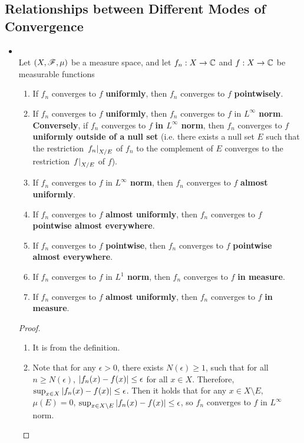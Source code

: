\documentclass[11pt]{article}
\begin{document}
\subsection{Relationships between Different Modes of Convergence}
\begin{itemize}
\item \begin{proposition} \citep{tao2011introduction}\\
 Let $(X, {\mathscr F}, \mu)$ be a measure space, and let $f_n : X \rightarrow {\mathbb C}$ and $f : X \rightarrow {\mathbb C}$ be measurable functions
\begin{enumerate}
\item If $f_n$ converges to $f$ \textbf{uniformly}, then $f_n$ converges to $f$ \textbf{pointwisely}.
\item If $f_n$ converges to $f$ \textbf{uniformly}, then $f_n$ converges to $f$ in \textbf{$L^\infty$ norm}. \textbf{Conversely}, if $f_n$ converges to $f$ \textbf{in $L^\infty$ norm}, then $f_n$ converges to $f$ \textbf{uniformly outside of a null set} (i.e. there exists a null set $E$ such that the restriction $\left.{f_n}\right\vert_{X/E}$ of $f_n$ to the complement of $E$ converges to the restriction $\left.{f}\right\vert_{X/E}$ of $f$).
\item If $f_n$ converges to $f$ in \textbf{$L^\infty$ norm}, then $f_n$ converges to $f$ \textbf{almost uniformly}.
\item If $f_n$ converges to $f$ \textbf{almost uniformly}, then $f_n$ converges to $f$ \textbf{pointwise almost everywhere}.
\item If $f_n$ converges to $f$ \textbf{pointwise}, then $f_n$ converges to $f$ \textbf{pointwise almost everywhere}.
\item If $f_n$ converges to $f$ in \textbf{$L^1$ norm}, then $f_n$ converges to $f$ \textbf{in measure}.
\item If $f_n$ converges to $f$ \textbf{almost uniformly}, then $f_n$ converges to $f$ \textbf{in measure}.
\end{enumerate}
\end{proposition}
\begin{proof}
\begin{enumerate}
\item It is from the definition.
\item Note that for any $\epsilon>0$, there exists $N(\epsilon)\ge 1$, such that for all $n\ge N(\epsilon)$, $\left\lvert f_{n}(x)- f(x) \right\rvert\le \epsilon$ for all $x\in X$. Therefore, $\sup_{x\in X}\left\lvert f_{n}(x)- f(x) \right\rvert\le \epsilon$. Then it holds that for any $x\in X \setminus E$, $\mu(E)=0$, $\sup_{x\in X\setminus E}\left\lvert f_{n}(x)- f(x) \right\rvert\le \epsilon$, so $f_{n}$ converges to $f$ in $L^\infty$ norm.


\end{enumerate}
\end{proof}
\end{itemize}
\end{document}
